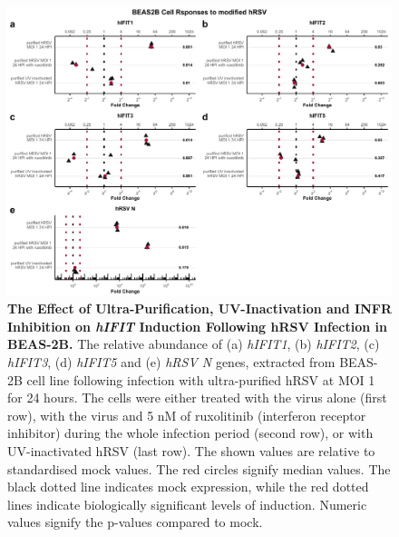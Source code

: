 \begin{figure}
    \centering
    \includegraphics[width=1\linewidth]{06. Chapter 1/Figs/01. Induction/10. beas2b_hrsv.pdf}
    \caption[The Effect of Ultra-Purification, UV-Inactivation and INFR Inhibition on \textit{hIFIT} Induction Following hRSV Infection in BEAS-2B.]{\textbf{The Effect of Ultra-Purification, UV-Inactivation and INFR Inhibition on \textit{hIFIT} Induction Following hRSV Infection in BEAS-2B.} The relative abundance of (a) \textit{hIFIT1}, (b) \textit{hIFIT2}, (c) \textit{hIFIT3}, (d) \textit{hIFIT5} and (e) \textit{hRSV N} genes, extracted from BEAS-2B cell line following infection with ultra-purified hRSV at MOI 1 for 24 hours. The cells were either treated with the virus alone (first row), with the virus and 5 nM of ruxolitinib (interferon receptor inhibitor) during the whole infection period (second row), or with UV-inactivated hRSV (last row). The shown values are relative to standardised mock values. The red circles signify median values. The black dotted line indicates mock expression, while the red dotted lines indicate biologically significant levels of induction. Numeric values signify the p-values compared to mock.}
    \label{fig:The effect of ultra-purification, UV-inactivation and INFR inhibition on hIFIT induction following hRSV infection in BEAS-2B}
\end{figure}

